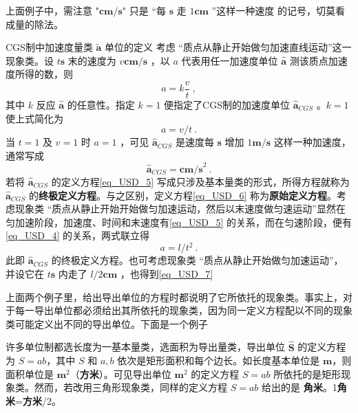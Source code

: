 上面例子中，需注意 "$\boldsymbol{cm/s}$" 只是 “每 $\boldsymbol{s}$ 走 $1\boldsymbol{cm}$ ”这样一种速度 的记号，切莫看成量的除法。
\begin{example}{CGS制中加速度量类 $\tilde{\boldsymbol{a}}$ 单位的定义}\label{ex_USD_2}
考虑 “质点从静止开始做匀加速直线运动”这一现象类。设 $t\boldsymbol{s}$ 末的速度为 $v\boldsymbol{cm/s}$ ，以 $a$ 代表用任一加速度单位 $\hat{\boldsymbol{a}}$ 测该质点加速度所得的数，则
\begin{equation}\label{eq_USD_6}
a=k\frac{v}{t}~,
\end{equation}
其中 $k$ 反应 $\hat{\boldsymbol{a}}$ 的任意性。指定 $k=1$ 便指定了CGS制的加速度单位 $\hat{\boldsymbol{a}}_{CGS}$ 。$k=1$ 使上式简化为
\begin{equation}\label{eq_USD_5}
a=v/t~.
\end{equation}
当 $t=1$ 及 $v=1$ 时 $a=1$ ，可见 $\hat{\boldsymbol{a}}_{CGS}$ 是速度每 $\boldsymbol{s}$ 增加 $1\boldsymbol{m/s}$ 这样一种加速度，通常写成
\begin{equation}
\hat{\boldsymbol{a}}_{CGS}=\boldsymbol{cm/s}^2~.
\end{equation}
若将 $\hat{\boldsymbol{a}}_{CGS}$ 的定义方程\autoref{eq_USD_5} 写成只涉及基本量类的形式，所得方程就称为  $\hat{\boldsymbol{a}}_{CGS}$ 的\textbf{终极定义方程}。与之区别，定义方程\autoref{eq_USD_6} 称为\textbf{原始定义方程}。考虑现象类 “质点从静止开始开始做匀加速运动，然后以末速度做匀速运动”显然在匀加速阶段，加速度、时间和末速度有\autoref{eq_USD_5} 的关系，而在匀速阶段，便有\autoref{eq_USD_4} 的关系，两式联立得
\begin{equation}\label{eq_USD_7}
a=l/t^2~.
\end{equation}
此即 $\hat{\boldsymbol{a}}_{CGS}$ 的终极定义方程。也可考虑现象类 “质点从静止开始做匀加速运动”，并设它在 $t\boldsymbol{s}$ 内走了 $l/2\boldsymbol{cm}$ ，也得到\autoref{eq_USD_7} 
\end{example}
上面两个例子里，给出导出单位的方程时都说明了它所依托的现象类。事实上，对于每一导出单位都必须给出其所依托的现象类，因为同一定义方程配以不同的现象类可能定义出不同的导出单位。下面是一个例子
\begin{example}{}
许多单位制都选长度为一基本量类，选面积为导出量类，导出单位 $\hat{\boldsymbol{S}}$ 的定义方程为 $S=ab$，其中 $S$ 和 $a,b$ 依次是矩形面积和每个边长。如长度基本单位是 $\boldsymbol{m}$，则面积单位是 $\boldsymbol{m}^2$（\textbf{方米}）。可见导出单位 $\boldsymbol{m}^2$ 的定义方程 $S=ab$ 所依托的是矩形现象类。然而，若改用三角形现象类，同样的定义方程 $S=ab$ 给出的是 \textbf{角米}。1\textbf{角米}=\textbf{方米}/2。
\end{example}
